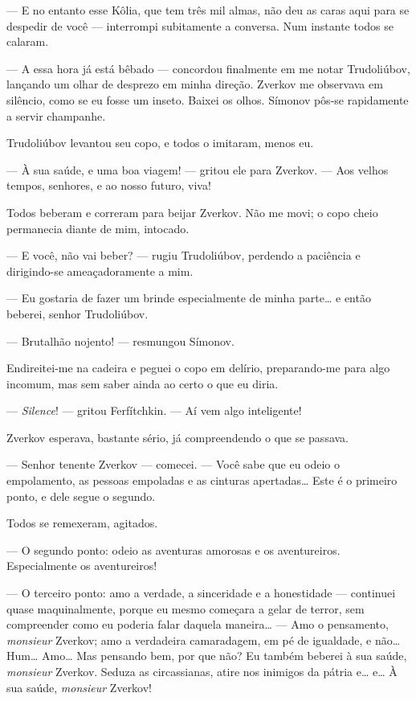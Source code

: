 --- E no entanto esse Kôlia, que tem três mil almas, não deu as caras aqui
para se despedir de você --- interrompi subitamente a conversa. Num
instante todos se calaram.

--- A essa hora já está bêbado --- concordou finalmente em me notar
Trudoliúbov, lançando um olhar de desprezo em minha direção. Zverkov me
observava em silêncio, como se eu fosse um inseto. Baixei os olhos.
Símonov pôs-se rapidamente a servir champanhe.

Trudoliúbov levantou seu copo, e todos o imitaram, menos eu.

--- À sua saúde, e uma boa viagem! --- gritou ele para Zverkov. --- Aos velhos
tempos, senhores, e ao nosso futuro, viva!

Todos beberam e correram para beijar Zverkov. Não me movi; o copo cheio
permanecia diante de mim, intocado.

--- E você, não vai beber? --- rugiu Trudoliúbov, perdendo a paciência e
dirigindo-se ameaçadoramente a mim.

--- Eu gostaria de fazer um brinde especialmente de minha parte\ldots{} e então
beberei, senhor Trudoliúbov.

--- Brutalhão nojento! --- resmungou Símonov.

Endireitei-me na cadeira e peguei o copo em delírio, preparando-me para
algo incomum, mas sem saber ainda ao certo o que eu diria.

--- \textit{Silence}! --- gritou Ferfítchkin. --- Aí vem algo inteligente!

Zverkov esperava, bastante sério, já compreendendo o que se passava.

--- Senhor tenente Zverkov --- comecei. --- Você sabe que eu odeio o
empolamento, as pessoas empoladas e as cinturas apertadas\ldots{} Este é o
primeiro ponto, e dele segue o segundo.

Todos se remexeram, agitados.

--- O segundo ponto: odeio as aventuras amorosas e os aventureiros.
Especialmente os aventureiros!

--- O terceiro ponto: amo a verdade, a sinceridade e a honestidade ---
continuei quase maquinalmente, porque eu mesmo começara a gelar de
terror, sem compreender como eu poderia falar daquela maneira\ldots{} --- Amo
o pensamento, \textit{monsieur} Zverkov; amo a verdadeira camaradagem,
em pé de igualdade, e não\ldots{} Hum\ldots{} Amo\ldots{} Mas pensando bem, por que
não? Eu também beberei à sua saúde, \textit{monsieur} Zverkov. Seduza
as circassianas, atire nos inimigos da pátria e\ldots{} e\ldots{} À sua saúde,
\textit{monsieur} Zverkov!

